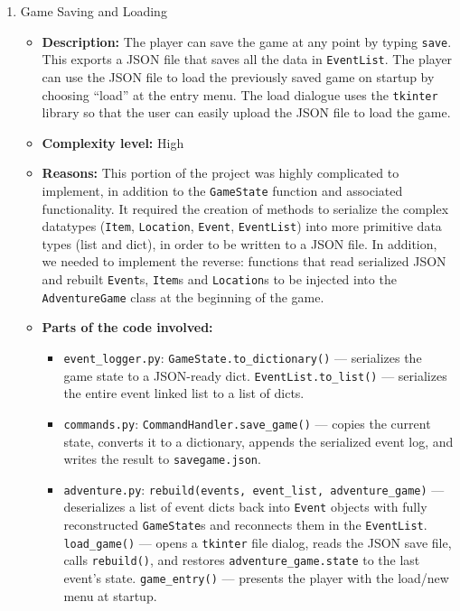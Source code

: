 \documentclass[11pt]{article}
\begin{document}
\begin{enumerate}
\begin{itemize}
        \item \textbf{Demo commands:}
\begin{verbatim}
enhancement1_demo = ['go north', 'go east', 'undo', 'undo']
\end{verbatim}
    \end{itemize}

    \item Game Saving and Loading
    \begin{itemize}
        \item \textbf{Description:} The player can save the game at any point by typing \verb|save|. This exports a JSON file that saves all the data in \verb|EventList|. The player can use the JSON file to load the previously saved game on startup by choosing ``load'' at the entry menu. The load dialogue uses the \verb|tkinter| library so that the user can easily upload the JSON file to load the game.

        \item \textbf{Complexity level:} High

        \item \textbf{Reasons:} This portion of the project was highly complicated to implement, in addition to the \verb|GameState| function and associated functionality. It required the creation of methods to serialize the complex datatypes (\verb|Item|, \verb|Location|, \verb|Event|, \verb|EventList|) into more primitive data types (list and dict), in order to be written to a JSON file. In addition, we needed to implement the reverse: functions that read serialized JSON and rebuilt \verb|Event|s, \verb|Item|s and \verb|Location|s to be injected into the \verb|AdventureGame| class at the beginning of the game.

        \item \textbf{Parts of the code involved:}
        \begin{itemize}
            \item \verb|event_logger.py|: \verb|GameState.to_dictionary()| --- serializes the game state to a JSON-ready dict. \verb|EventList.to_list()| --- serializes the entire event linked list to a list of dicts.
            \item \verb|commands.py|: \verb|CommandHandler.save_game()| --- copies the current state, converts it to a dictionary, appends the serialized event log, and writes the result to \verb|savegame.json|.
            \item \verb|adventure.py|: \verb|rebuild(events, event_list, adventure_game)| --- deserializes a list of event dicts back into \verb|Event| objects with fully reconstructed \verb|GameState|s and reconnects them in the \verb|EventList|. \verb|load_game()| --- opens a \verb|tkinter| file dialog, reads the JSON save file, calls \verb|rebuild()|, and restores \verb|adventure_game.state| to the last event's state. \verb|game_entry()| --- presents the player with the load/new menu at startup.
        \end{itemize}


\end{itemize}
\end{enumerate}
\end{document}
